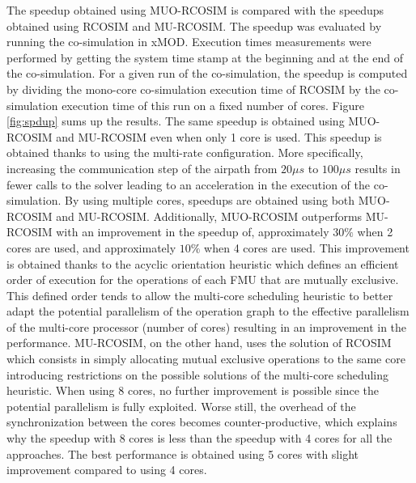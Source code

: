 The speedup obtained using MUO-RCOSIM is compared with the speedups obtained using RCOSIM and MU-RCOSIM. The speedup was evaluated by running the co-simulation in xMOD. Execution times measurements were performed by getting the system time stamp at the beginning and at the end of the co-simulation. For a given run of the co-simulation, the speedup is computed by dividing the mono-core co-simulation execution time of RCOSIM by the co-simulation execution time of this run on a fixed number of cores. Figure \ref{fig:spdup} sums up the results. The same speedup is obtained using MUO-RCOSIM and MU-RCOSIM even when only 1 core is used. This speedup is obtained thanks to using the multi-rate configuration. More specifically, increasing the communication step of the airpath from $20 {\mu}s$ to $100 {\mu}s$ results in fewer calls to the solver leading to an acceleration in the execution of the co-simulation. By using multiple cores, speedups are obtained using both MUO-RCOSIM and MU-RCOSIM. Additionally, MUO-RCOSIM outperforms MU-RCOSIM with an improvement in the speedup of, approximately $30\%$ when 2 cores are used, and approximately $10\%$ when 4 cores are used. This improvement is obtained thanks to the acyclic orientation heuristic which defines an efficient order of execution for the operations of each FMU that are mutually exclusive. This defined order tends to allow the multi-core scheduling heuristic to better adapt the potential parallelism of the operation graph to the effective parallelism of the multi-core processor (number of cores) resulting in an improvement in the performance. MU-RCOSIM, on the other hand, uses the solution of RCOSIM which consists in simply allocating mutual exclusive operations to the same core introducing restrictions on the possible solutions of the multi-core scheduling heuristic. When using 8 cores, no further improvement is possible since the potential parallelism is fully exploited. Worse still, the overhead of the synchronization between the cores becomes counter-productive, which explains why the speedup with 8 cores is less than the speedup with 4 cores for all the approaches. The best performance is obtained using 5 cores with slight improvement compared to using 4 cores. 

